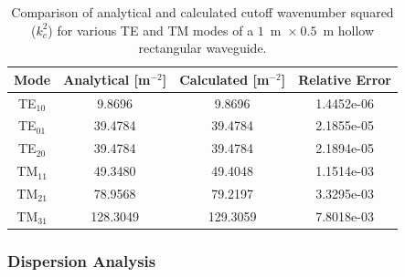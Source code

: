 \begin{table}[b]
 \centering
    \caption{Comparison of analytical and calculated cutoff wavenumber squared ($k_c^2$) for various TE and TM modes of a $1$~m~$\times~0.5$~m hollow rectangular waveguide.}
    \label{lezar:tab:rectangular_cutoff_comparison}
    \begin{tabular}{|c|c|c|c|}
    \hline
    Mode & Analytical [m$^{-2}$] & Calculated [m$^{-2}$] & Relative Error \\
    \hline
    TE$_{10}$ & 9.8696 & 9.8696 & 1.4452e-06\\
    TE$_{01}$ & 39.4784 & 39.4784 & 2.1855e-05\\
    TE$_{20}$ & 39.4784 & 39.4784 & 2.1894e-05\\
    \hline
    TM$_{11}$ & 49.3480 & 49.4048 & 1.1514e-03 \\
    TM$_{21}$ & 78.9568 & 79.2197 & 3.3295e-03\\
    TM$_{31}$ & 128.3049 & 129.3059 & 7.8018e-03\\
    \hline 
    \end{tabular}
\end{table}
\clearpage
\subsubsection{Dispersion Analysis}

